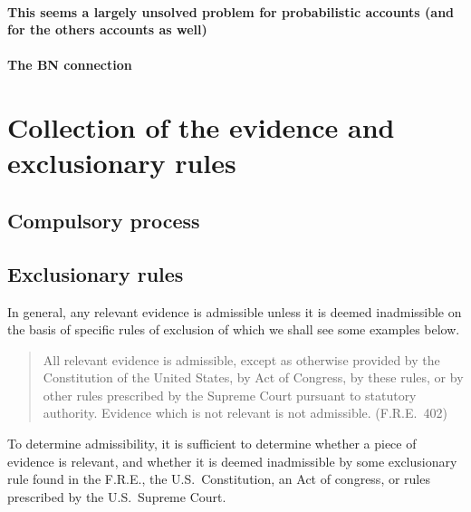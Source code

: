 \documentclass[10pt]{article}
\begin{document}
\paragraph{This seems a largely unsolved problem for probabilistic accounts (and for the others accounts as well)}

\paragraph{The BN connection}


\section{Collection of the evidence and exclusionary rules}

\subsection{Compulsory process}

\subsection{Exclusionary rules}

In general, any relevant evidence is admissible unless it is deemed inadmissible on the basis of 
specific rules of exclusion of which we shall see some examples below.  
%
\begin{quote}
\begin{singlespace}
All relevant evidence is admissible, except as otherwise provided by the Constitution of the United States, by Act of Congress, by these rules, or by other rules prescribed by the Supreme Court pursuant to statutory authority. Evidence which is not relevant is not admissible. (F.R.E.\ 402)
\end{singlespace}
\end{quote}
%
To determine admissibility, it is sufficient to determine whether a piece of evidence is relevant, 
and whether it is deemed inadmissible by some exclusionary rule found in the F.R.E., 
the U.S.\ Constitution, an Act of congress, or rules prescribed by 
the U.S.\ Supreme Court.
\end{document}
